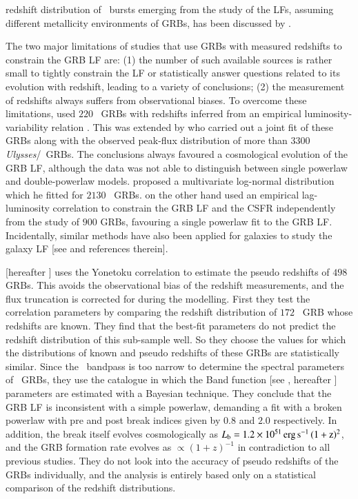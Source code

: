 redshift distribution of \s\ bursts emerging from the study of the LFs, assuming different metallicity environments of GRBs, has been discussed by \cite{Natarajan_et_al.-2005-MNRAS}.

The two major limitations of studies that use GRBs with measured redshifts to constrain the GRB LF are: (1) the number of such available sources is rather small to tightly constrain the LF or statistically answer questions related to its evolution with redshift, leading to a variety of conclusions; (2) the measurement of redshifts always suffers from observational biases. To overcome these limitations, \cite{Lloyd-Ronning_et_al.-2002-ApJ} used $220$ \B\ GRBs with redshifts inferred from an empirical luminosity-variability relation \citep{Fenimore_and_Ramirez-Ruiz-2000-arXiv}. This was extended by \cite{Firmani_et_al.-2004-ApJ} who carried out a joint fit of these GRBs along with the observed peak-flux distribution of more than $3300$ \emph{Ulysses}/\B\ GRBs. The conclusions always favoured a cosmological evolution of the GRB LF, although the data was not able to distinguish between single powerlaw and double-powerlaw models. \cite{Shahmoradi-2013-ApJ} proposed a multivariate log-normal distribution which he fitted for $2130$ \B\ GRBs. \cite{Kocevski_&_Liang-2006-ApJ} on the other hand used an empirical lag-luminosity correlation to constrain the GRB LF and the CSFR independently from the study of $900$ GRBs, favouring a single powerlaw fit to the GRB LF. Incidentally, similar methods have also been applied for galaxies to study the galaxy LF [see \cite{Galaxy_LF_pseudo_redshift-2017-arXiv} and references therein].

\cite{Tan_et_al.-2013-ApJL} [hereafter ] uses the Yonetoku correlation to estimate the pseudo redshifts of $498$ GRBs. This avoids the observational bias of the redshift measurements, and the flux truncation is corrected for during the modelling. First they test the correlation parameters by comparing the redshift distribution of $172$ \s\ GRB whose redshifts are known. They find that the best-fit parameters do not predict the redshift distribution of this sub-sample well. So they choose the values for which the distributions of known and pseudo redshifts of these GRBs are statistically similar. Since the \s\ bandpass is too narrow to determine the spectral parameters of \s\ GRBs, they use the \cite{Butler_et_al.-2007-ApJ} catalogue in which the Band function [see \cite{Band_et_al.-1993-ApJ}, hereafter ] parameters are estimated with a Bayesian technique. They conclude that the GRB LF is inconsistent with a simple powerlaw, demanding a fit with a broken powerlaw with pre and post break indices given by $0.8$ and $2.0$ respectively. In addition, the break itself evolves cosmologically as $L_{\rm{b}} = 1.2 \times 10^{51} \, \rm erg \, s^{-1} \, (1+z)^{2}$, and the GRB formation rate evolves as $\propto(1+z)^{-1}$ in contradiction to all previous studies. They do not look into the accuracy of pseudo redshifts of the GRBs individually, and the analysis is entirely based only on a statistical comparison of the redshift distributions.

